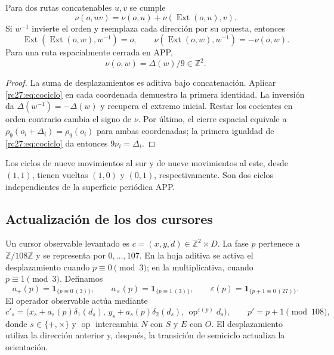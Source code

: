 \begin{proposition}
Para dos rutas concatenables $u,v$ se cumple
\[
\nu(o,uv)=\nu(o,u)+\nu(\operatorname{Ext}(o,u),v).
\]
Si $w^{-1}$ invierte el orden y reemplaza cada dirección por su
opuesta, entonces
\[
\operatorname{Ext}(\operatorname{Ext}(o,w),w^{-1})=o,
\qquad
\nu(\operatorname{Ext}(o,w),w^{-1})=-\nu(o,w).
\]
Para una ruta espacialmente cerrada en APP,
\[
\nu(o,w)=\Delta(w)/9\in\mathbb Z^2.
\]
\end{proposition}
\begin{proof}
La suma de desplazamientos es aditiva bajo concatenación. Aplicar
\eqref{rc27:eq:cociclo} en cada coordenada demuestra la primera
identidad. La inversión da $\Delta(w^{-1})=-\Delta(w)$ y recupera
el extremo inicial. Restar los cocientes en orden contrario cambia
el signo de $\nu$. Por último, el cierre espacial equivale a
$\rho_9(o_i+\Delta_i)=\rho_9(o_i)$ para ambas coordenadas; la primera
igualdad de \eqref{rc27:eq:cociclo} da entonces $9\nu_i=\Delta_i$.
\end{proof}

Los ciclos de nueve movimientos al sur y de nueve movimientos al este,
desde $(1,1)$, tienen vueltas $(1,0)$ y $(0,1)$, respectivamente.
Son dos ciclos independientes de la superficie periódica APP.

\subsection{Actualización de los dos cursores}

Un cursor observable levantado es $c=(x,y,d)\in\mathbb Z^2\times D$.
La fase $p$ pertenece a $\mathbb Z/108\mathbb Z$ y se representa
por $0,\ldots,107$. En la hoja aditiva se activa el desplazamiento
cuando $p\equiv0\pmod3$; en la multiplicativa, cuando
$p\equiv1\pmod3$. Definamos
\[
a_+(p)=\mathbf1_{\{p\equiv0\ (3)\}},\qquad
a_\times(p)=\mathbf1_{\{p\equiv1\ (3)\}},\qquad
\varepsilon(p)=\mathbf1_{\{p+1\equiv0\ (27)\}}.
\]
El operador observable actúa mediante
\begin{equation}
c'_s=\bigl(x_s+a_s(p)\delta_1(d_s),\,
           y_s+a_s(p)\delta_2(d_s),\,
           \operatorname{op}^{\varepsilon(p)}d_s\bigr),
\qquad p'=p+1\pmod{108},
\label{rc27:eq:actualizacion}
\end{equation}
donde $s\in\{+,\times\}$ y $\operatorname{op}$ intercambia
$N$ con $S$ y $E$ con $O$.
El desplazamiento utiliza la dirección anterior y, después, la
transición de semiciclo actualiza la orientación.

